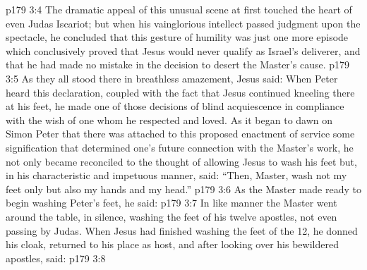 \vs p179 3:4 The dramatic appeal of this unusual scene at first touched the heart of even Judas Iscariot; but when his vainglorious intellect passed judgment upon the spectacle, he concluded that this gesture of humility was just one more episode which conclusively proved that Jesus would never qualify as Israel’s deliverer, and that he had made no mistake in the decision to desert the Master’s cause.
\vs p179 3:5 As they all stood there in breathless amazement, Jesus said:  When Peter heard this declaration, coupled with the fact that Jesus continued kneeling there at his feet, he made one of those decisions of blind acquiescence in compliance with the wish of one whom he respected and loved. As it began to dawn on Simon Peter that there was attached to this proposed enactment of service some signification that determined one’s future connection with the Master’s work, he not only became reconciled to the thought of allowing Jesus to wash his feet but, in his characteristic and impetuous manner, said: “Then, Master, wash not my feet only but also my hands and my head.”
\vs p179 3:6 As the Master made ready to begin washing Peter’s feet, he said: 
\vs p179 3:7 In like manner the Master went around the table, in silence, washing the feet of his twelve apostles, not even passing by Judas. When Jesus had finished washing the feet of the 12, he donned his cloak, returned to his place as host, and after looking over his bewildered apostles, said:
\vs p179 3:8 \pc {}
